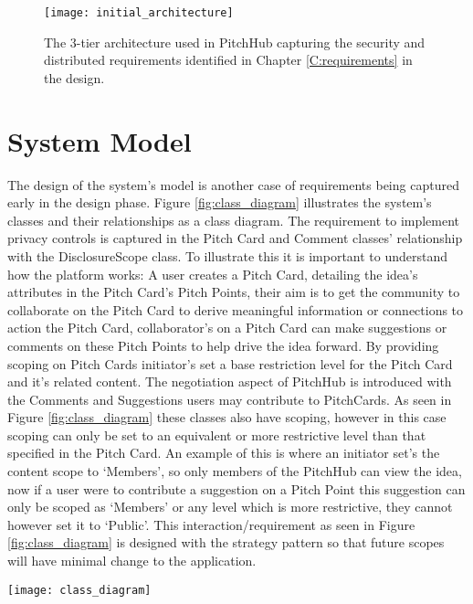 \begin{figure}[ht]
    \centering
    \texttt{[image: initial\_architecture]}
    \caption{The 3-tier architecture used in PitchHub capturing the security and distributed requirements identified in Chapter \ref{C:requirements} in the design.}
    \label{fig:architecture_1}
\end{figure}

\section{System Model}\label{S:systemModel}

The design of the system's model is another case of requirements being captured early in the design phase. Figure \ref{fig:class_diagram} illustrates the system's classes and their relationships as a class diagram. The requirement to implement privacy controls is captured in the Pitch Card and Comment classes' relationship with the DisclosureScope class. To illustrate this it is important to understand how the platform works: A user creates a Pitch Card, detailing the idea's attributes in the Pitch Card's Pitch Points, their aim is to get the community to collaborate on the Pitch Card to derive meaningful information or connections to action the Pitch Card, collaborator's on a Pitch Card can make suggestions or comments on these Pitch Points to help drive the idea forward. By providing scoping on Pitch Cards initiator's set a base restriction level for the Pitch Card and it's related content. The negotiation aspect of PitchHub is introduced with the Comments and Suggestions users may contribute to PitchCards. As seen in Figure \ref{fig:class_diagram} these classes also have scoping, however in this case scoping can only be set to an equivalent or more restrictive level than that specified in the Pitch Card. An example of this is where an initiator set's the content scope to `Members', so only members of the PitchHub can view the idea, now if a user were to contribute a suggestion on a Pitch Point this suggestion can only be scoped as `Members' or any level which is more restrictive, they cannot however set it to `Public'. This interaction/requirement as seen in Figure \ref{fig:class_diagram} is designed with the strategy pattern so that future scopes will have minimal change to the application.
 
\begin{sidewaysfigure}[ht]
    \centering
    \texttt{[image: class\_diagram]}
    \caption{PitchHub's system structure as represented in a class diagram. Of note is the Pitch Card and Comment classes and their relationship to the DisclosureScopes. This relationship describes the Pitch Card and Comment classes ability to scope the visibility of their content. (NB: Some attributes were left out for the sake of brevity e.g. Pitch Cards have an `images' attribute)}
    \label{fig:class_diagram}
\end{sidewaysfigure}

